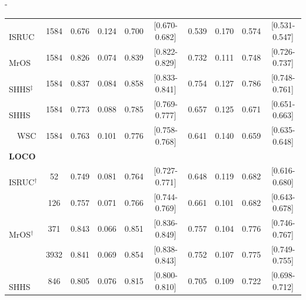 \begin{table}[tb]
\begin{adjustwidth*}{}{-\marginparsep}
\begin{threeparttable}
\begin{tabular}{@{}lccccccccc@{}}
\(\quad\)\acs{ISRUC}            & 1584            & 0.676         & 0.124       & 0.700           & [0.670-0.682]         & 0.539         & 0.170       & 0.574           & [0.531-0.547]         \\
\(\quad\)\acs{MrOS}             & 1584            & 0.826         & 0.074       & 0.839           & [0.822-0.829]         & 0.732         & 0.111       & 0.748           & [0.726-0.737]         \\
\(\quad\)\acs{SHHS}\(^{\ddagger}\)            & 1584            & 0.837         & 0.084       & 0.858           & [0.833-0.841]         & 0.754         & 0.127       & 0.786           & [0.748-0.761]         \\
\(\quad\)\acs{SHHS}              & 1584            & 0.773         & 0.088       & 0.785           & [0.769-0.777]         & 0.657         & 0.125       & 0.671           & [0.651-0.663]         \\
\(\quad\)\acs{WSC}              & 1584            & 0.763         & 0.101       & 0.776           & [0.758-0.768]         & 0.641         & 0.140       & 0.659           & [0.635-0.648]         \\
\textbf{LOCO}    &                 &               &             &                 &                       &               &             &                 &                       \\
\(\quad\)\acs{ISRUC}\(^{\dagger}\)           & 52              & 0.749         & 0.081       & 0.764           & [0.727-0.771]         & 0.648         & 0.119       & 0.682           & [0.616-0.680]         \\
                 & 126             & 0.757         & 0.071       & 0.766           & [0.744-0.769]         & 0.661         & 0.101       & 0.682           & [0.643-0.678]         \\
\(\quad\)\acs{MrOS}\(^{\dagger}\)            & 371             & 0.843         & 0.066       & 0.851           & [0.836-0.849]         & 0.757         & 0.104       & 0.776           & [0.746-0.767]         \\
                 & 3932            & 0.841         & 0.069       & 0.854           & [0.838-0.843]         & 0.752         & 0.107       & 0.775           & [0.749-0.755]         \\
\(\quad\)\acs{SHHS}             & 846             & 0.805         & 0.076       & 0.815           & [0.800-0.810]         & 0.705         & 0.109       & 0.722           & [0.698-0.712]         \\

\end{tabular}
\end{threeparttable}
\end{adjustwidth*}
\end{table}
